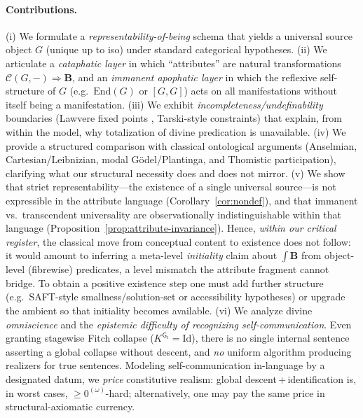 \documentclass[11pt]{article}
\theoremstyle{upright}
\begin{document}
\paragraph{Contributions.}
(i) We formulate a \emph{representability-of-being} schema that yields a universal source object \(G\) (unique up to iso) under standard categorical hypotheses. 
(ii) We articulate a \emph{cataphatic layer} in which “attributes” are natural transformations \(\mathcal C(G,-)\Rightarrow \mathbf B\), and an \emph{immanent apophatic layer} \citep{PseudoDionysius1987} in which the reflexive self-structure of \(G\) (e.g.\ \(\mathrm{End}(G)\) or \( [G,G]\)) acts on all manifestations without itself being a manifestation. 
(iii) We exhibit \emph{incompleteness/undefinability} boundaries (Lawvere fixed points \citep{Lawvere1969Diagonal}, Tarski-style constraints) that explain, from within the model, why totalization of divine predication is unavailable. 
(iv) We provide a structured comparison with classical ontological arguments (Anselmian, Cartesian/Leibnizian, modal Gödel/Plantinga, and Thomistic participation), clarifying what our structural necessity does and does not mirror. 
(v) We show that strict representability—the existence of a single universal source—is not expressible in the attribute language (Corollary~\ref{cor:nondef}), and that immanent vs.\ transcendent universality are observationally indistinguishable within that language (Proposition~\ref{prop:attribute-invariance}). Hence, \emph{within our critical register}, the classical move from conceptual content to existence does not follow: it would amount to inferring a meta-level \emph{initiality} claim about $\int\!\mathbf B$ from object-level (fibrewise) predicates, a level mismatch the attribute fragment cannot bridge. To obtain a positive existence step one must add further structure (e.g.\ SAFT-style smallness/solution-set or accessibility hypotheses) or upgrade the ambient so that initiality becomes available. 
(vi) We analyze divine \emph{omniscience} and the \emph{epistemic difficulty of recognizing self-communication}. Even granting stagewise Fitch collapse ($K^{\mathsf G_i}\!=\!\mathrm{Id}$), there is no single internal sentence asserting a global collapse without descent, and \emph{no} uniform algorithm producing realizers for true sentences. Modeling self-communication in-language by a designated datum, we \emph{price} constitutive realism: global descent\,+\,identification is, in worst cases, $\ge 0^{(\omega)}$-hard; alternatively, one may pay the same price in structural-axiomatic currency.
\end{document}
